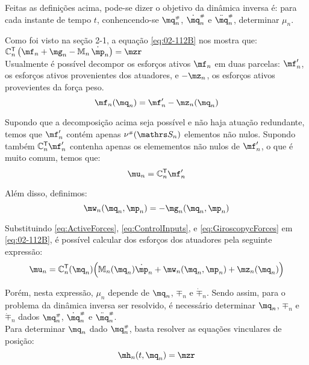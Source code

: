 Feitas as defini\c{c}\~oes acima, pode-se dizer o objetivo da din\^amica inversa \'e: para cada instante de tempo $t$, conhencendo-se $\mq_n\ssh$, $\dot{\mq}_n\ssh$ e $\ddot{\mq}_n\ssh$, determinar $\mu_n$.

Como foi visto na se\c{c}\~ao 2-1, a equa\c{c}\~ao \eqref{eq:02-112B} nos mostra que: \\

$ \mC_{n}^\msT \left( \mf_{n} + \mg_{n} - \mM_{n} \, \dot \mp_{n} \right) = \mzr $ \\

Usualmente \'e poss\'ivel decompor os esfor\c{c}os ativos $\mf_{n}$ em duas parcelas: $\mf'_n$, os esfor\c{c}os ativos provenientes dos atuadores, e $-\mz_n$, os esfor\c{c}os ativos provevientes da for\c{c}a peso.
\begin{equation} \label{eq:ActiveForces}
\mf_n (\mq_n) = \mf'_n - \mz_n(\mq_n)
\end{equation}

Supondo que a decomposi\c{c}\~ao acima seja poss\'ivel e n\~ao haja atua\c{c}\~ao redundante, temos que $\mf'_n$ cont\'em apenas $ \nu\ssh(\ssS_n)$ elementos n\~ao nulos. Supondo tamb\'em $\mC_n^\msT \mf'_n$ contenha apenas os elemementos n\~ao nulos de $\mf'_n$, o que \'e muito comum, temos que:
\begin{equation} \label{eq:ControlInputs}
\mu_n = \mC_n^\msT \mf'_n
\end{equation}

Al\'em disso, definimos:
\begin{equation} \label{eq:GiroscopycForces}
\mw_n (\mq_n, \mp_n) = -\mg_n (\mq_n, \mp_n)
\end{equation}

Substituindo \eqref{eq:ActiveForces}, \eqref{eq:ControlInputs}, e \eqref{eq:GiroscopycForces} em \eqref{eq:02-112B}, \'e poss\'ivel calcular dos esfor\c{c}os dos atuadores pela seguinte express\~ao:
\begin{equation} \label{eq:InverseDynamics}
\mu_n = \mC_n^\msT(\mq_n) \Big( \mM_n(\mq_n) \dot{\mp}_n + \mw_n(\mq_n, \mp_n) + \mz_n(\mq_n) \Big)
\end{equation}

Por\'em, nesta express\~ao, $\mu_n$ depende de $\mq_n$, $\mp_n$ e $\dot{\mp}_n$. Sendo assim, para o problema da din\^amica inversa ser resolvido, \'e necess\'ario determinar $\mq_n$, $\mp_n$ e $\dot{\mp}_n$ dados $\mq_n\ssh$, $\dot{\mq}_n\ssh$ e $\ddot{\mq}_n\ssh$. \\

Para determinar $\mq_n$ dado $\mq_n\ssh$, basta resolver as equa\c{c}\~oes vinculares de posi\c{c}\~ao: 
\begin{equation} \label{eq:PositionConstraints}
\mh_n(t, \mq_n) = \mzr
\end{equation}

